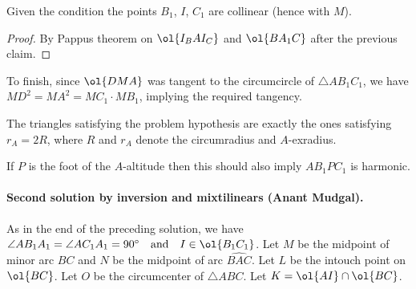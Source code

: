 \documentclass[11pt]{scrartcl}
\begin{document}
\begin{claim*}
  Given the condition the points $B_1$, $I$, $C_1$ are collinear
  (hence with $M$).
\end{claim*}
\begin{proof}
  By Pappus theorem on $\ol{I_B A I_C}$ and $\ol{BA_1C}$
  after the previous claim.
\end{proof}

To finish, since $\ol{DMA}$ was tangent to the circumcircle of
$\triangle AB_1C_1$, we have $MD^2 = MA^2 = MC_1 \cdot MB_1$,
implying the required tangency.


\begin{remark*}
The triangles satisfying the problem hypothesis
are exactly the ones satisfying $r_A = 2R$,
where $R$ and $r_A$ denote the circumradius and $A$-exradius.
\end{remark*}

\begin{remark*}
  If $P$ is the foot of the $A$-altitude
  then this should also imply $AB_1PC_1$ is harmonic.
\end{remark*}

\paragraph{Second solution by inversion and mixtilinears (Anant Mudgal).}
As in the end of the preceding solution, we have
$\angle AB_1A_1=\angle AC_1A_1=90^{\circ}
\quad\text{and}\quad I \in \ol{B_1 C_1}$.
Let $M$ be the midpoint of minor arc $BC$
and $N$ be the midpoint of arc $\widehat{BAC}$.
Let $L$ be the intouch point on $\ol{BC}$.
Let $O$ be the circumcenter of $\triangle ABC$.
Let $K=\ol{AI} \cap \ol{BC}$.
\end{document}
